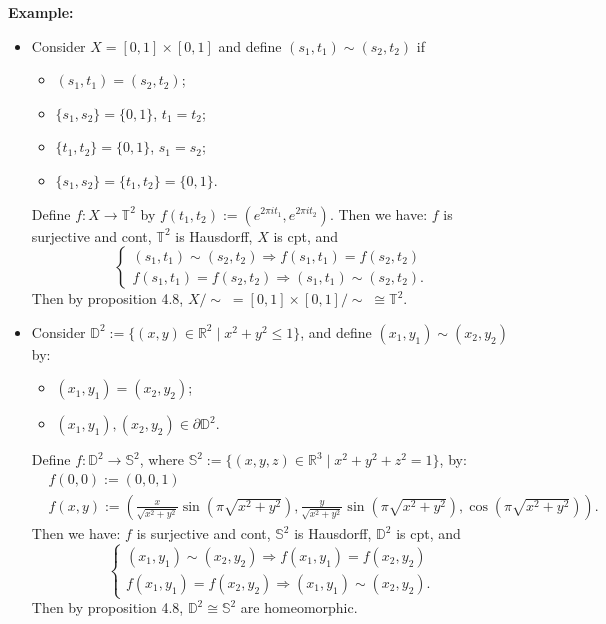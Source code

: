 \noindent\textbf{Example:}
\begin{itemize}
    \item Consider $X = [0,1] \times [0,1]$ and define $(s_1 ,t_1) \sim (s_2,t_2)$ if
    \begin{itemize}
        \item $(s_1 ,t_1) = (s_2,t_2)$;
        \item $\{ s_1,s_2\} = \{0,1\}$, $ t_1=t_2$;
        \item $\{t_1,t_2\} = \{0,1\}$, $s_1=s_2$;
        \item $\{ s_1,s_2\} = \{t_1,t_2\} = \{0,1\}$.
    \end{itemize}
    Define $f: X \rightarrow \mathbb{T}^2$ by $f(t_1,t_2) := (e^{2\pi it_1}, e^{2\pi it_2})$. Then we have: $f$ is surjective and cont, $\mathbb{T}^2$ is Hausdorff, $X$ is cpt, and 
    $$\begin{cases}
        (s_1,t_1) \sim (s_2,t_2) \Rightarrow f(s_1,t_1)=f (s_2,t_2)\\
        f(s_1,t_1)=f (s_2,t_2) \Rightarrow (s_1,t_1) \sim (s_2,t_2).
    \end{cases}$$
    Then by proposition 4.8, $X/\sim \; = [0,1]\times [0,1] /\sim \; \cong \mathbb{T}^2$.
    \item Consider $\mathbb{D}^2 := \{ (x,y) \in \mathbb{R}^2 \mid x^2 + y^2 \leq 1 \}$, and define $(x_1,y_1) \sim (x_2,y_2)$ by:
    \begin{itemize}
        \item $(x_1,y_1) = (x_2,y_2)$;
        \item $(x_1,y_1) , (x_2,y_2)\in \partial \mathbb{D}^2$.
    \end{itemize}
    Define $f:\mathbb{D}^2 \rightarrow \mathbb{S}^2$, where $\mathbb{S}^2 := \{ (x,y,z) \in \mathbb{R}^3 \mid x^2+y^2+z^2=1 \}$, by: 
    \begin{align*}
        &f(0,0) := (0,0,1)\\
        &f(x,y) := (\frac{x}{\sqrt{x^2 +y^2}} \sin (\pi\sqrt{x^2 +y^2}), \frac{y}{\sqrt{x^2 +y^2}} \sin (\pi \sqrt{x^2 +y^2}) , \cos(\pi \sqrt{x^2 +y^2})).
    \end{align*}
    Then we have: $f$ is surjective and cont, $\mathbb{S}^2$ is Hausdorff, $\mathbb{D}^2$ is cpt, and
    $$\begin{cases}
        (x_1,y_1) \sim (x_2,y_2) \Rightarrow f(x_1,y_1)=f (x_2,y_2)\\
        f(x_1,y_1)=f (x_2,y_2) \Rightarrow (x_1,y_1) \sim (x_2,y_2).
    \end{cases}$$
    Then by proposition 4.8, $\mathbb{D}^2 \cong \mathbb{S}^2$ are homeomorphic.
\end{itemize}

